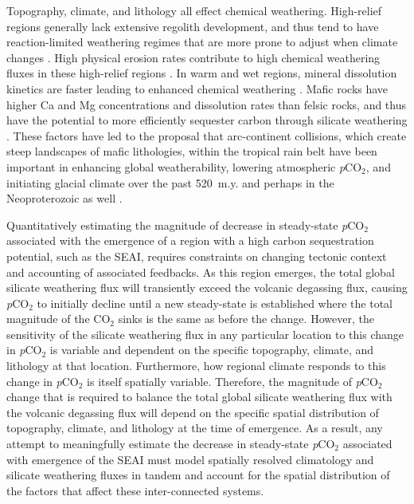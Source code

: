 \documentclass[9pt,twocolumn,twoside,lineno]{pnas-new}
\newcommand{\pCOtwo}{\textit{p}CO$_{2}$\xspace}
\newcommand{\COtwo}{CO$_{2}$\xspace}
\begin{document}
Topography, climate, and lithology all effect chemical weathering. High-relief regions generally lack extensive regolith development, and thus tend to have reaction-limited weathering regimes that are more prone to adjust when climate changes \cite{Gabet2009a, West2012a, Maher2014a}. High physical erosion rates contribute to high chemical weathering fluxes in these high-relief regions \citep{Godderis2017b}. In warm and wet regions, mineral dissolution kinetics are faster leading to enhanced chemical weathering \cite{Lasaga1994a, West2012a}. Mafic rocks have higher Ca and Mg concentrations and dissolution rates than felsic rocks, and thus have the potential to more efficiently sequester carbon through silicate weathering \cite{Dessert2003a}. These factors have led to the proposal that arc-continent collisions, which create steep landscapes of mafic lithologies, within the tropical rain belt have been important in enhancing global weatherability, lowering atmospheric \pCOtwo, and initiating glacial climate over the past 520~m.y. \cite{Jagoutz2016a, Swanson-Hysell2017a, Macdonald2019a} and perhaps in the Neoproterozoic as well \cite{Park2020a}.

Quantitatively estimating the magnitude of decrease in steady-state \pCOtwo associated with the emergence of a region with a high carbon sequestration potential, such as the SEAI, requires constraints on changing tectonic context and accounting of associated feedbacks. As this region emerges, the total global silicate weathering flux will transiently exceed the volcanic degassing flux, causing \pCOtwo to initially decline until a new steady-state is established where the total magnitude of the \COtwo sinks is the same as before the change. However, the sensitivity of the silicate weathering flux in any particular location to this change in \pCOtwo is variable and dependent on the specific topography, climate, and lithology at that location. Furthermore, how regional climate responds to this change in \pCOtwo is itself spatially variable. Therefore, the magnitude of \pCOtwo change that is required to balance the total global silicate weathering flux with the volcanic degassing flux will depend on the specific spatial distribution of topography, climate, and lithology at the time of emergence. As a result, any attempt to meaningfully estimate the decrease in steady-state \pCOtwo associated with emergence of the SEAI must model spatially resolved climatology and silicate weathering fluxes in tandem and account for the spatial distribution of the factors that affect these inter-connected systems.
\end{document}
